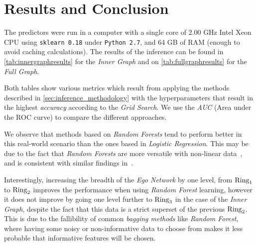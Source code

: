 
\section{Results and Conclusion}
\label{sec:results}





The predictors were run in a computer with a single core of 2.00 GHz Intel Xeon CPU using \texttt{sklearn 0.18} under \texttt{Python 2.7}, and 64 GB of RAM (enough to avoid caching calculations). The results of the inference can be found in \cref{tab:innergraphresults} for the \emph{Inner Graph} and on \cref{tab:fullgraphresults} for the \emph{Full Graph}.


Both tables show various metrics which result from applying the methods described in \cref{sec:inference_methodology} with the hyperparameters that result in the highest \emph{accuracy} according to the \emph{Grid Search}.
We use the \emph{AUC} (Area under the ROC curve) to compare the different approaches.

We observe that methods based on \emph{Random Forests} tend to perform better in this real-world scenario than the ones based in \emph{Logistic Regression}.
This may be due to the fact that \emph{Random Forests} are more versatile with non-linear data~\cite{logisticvsdecision}, and is consistent with similar findings in~\cite{muchlinski2016}.

Interestingly, increasing the breadth of the \emph{Ego Network} by one level, from $\operatorname{Ring}_1$ to $\operatorname{Ring}_2$ improves the performance when using \emph{Random Forest} learning, however it does not improve by going one level further to $\operatorname{Ring}_3$ in the case of the \emph{Inner Graph}, despite the fact that this data is a strict superset of the previous $\operatorname{Ring}_2$. This is due to the fallibility of common \emph{bagging methods} like \emph{Random Forest}, where having some noisy or non-informative data to choose from makes it less probable that informative features will be chosen.

